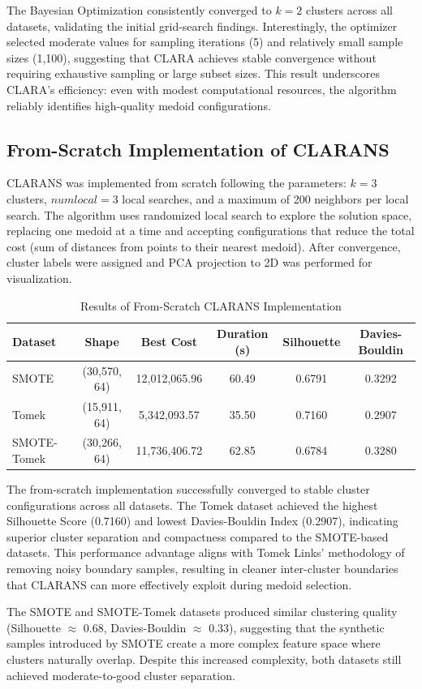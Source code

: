 The Bayesian Optimization consistently converged to $k=2$ clusters across all datasets, validating the initial grid-search findings. Interestingly, the optimizer selected moderate values for sampling iterations (5) and relatively small sample sizes (1,100), suggesting that CLARA achieves stable convergence without requiring exhaustive sampling or large subset sizes. This result underscores CLARA's efficiency: even with modest computational resources, the algorithm reliably identifies high-quality medoid configurations.


\subsection{From-Scratch Implementation of CLARANS}

CLARANS was implemented from scratch following the parameters: $k=3$ clusters, $numlocal=3$ local searches, and a maximum of 200 neighbors per local search. The algorithm uses randomized local search to explore the solution space, replacing one medoid at a time and accepting configurations that reduce the total cost (sum of distances from points to their nearest medoid). After convergence, cluster labels were assigned and PCA projection to 2D was performed for visualization.

\begin{table}[H]
\centering
\caption{Results of From-Scratch CLARANS Implementation}
\label{tab:clarans_scratch_results}
\begin{tabular}{|l|c|c|c|c|c|}
\hline
\textbf{Dataset} & \textbf{Shape} & \textbf{Best Cost} & \textbf{Duration (s)} & \textbf{Silhouette} & \textbf{Davies-Bouldin} \\ \hline
SMOTE & (30,570, 64) & 12,012,065.96 & 60.49 & 0.6791 & 0.3292 \\ \hline
Tomek & (15,911, 64) & 5,342,093.57 & 35.50 & 0.7160 & 0.2907 \\ \hline
SMOTE-Tomek & (30,266, 64) & 11,736,406.72 & 62.85 & 0.6784 & 0.3280 \\ \hline
\end{tabular}
\end{table}

The from-scratch implementation successfully converged to stable cluster configurations across all datasets. The Tomek dataset achieved the highest Silhouette Score (0.7160) and lowest Davies-Bouldin Index (0.2907), indicating superior cluster separation and compactness compared to the SMOTE-based datasets. This performance advantage aligns with Tomek Links' methodology of removing noisy boundary samples, resulting in cleaner inter-cluster boundaries that CLARANS can more effectively exploit during medoid selection.

The SMOTE and SMOTE-Tomek datasets produced similar clustering quality (Silhouette $\approx$ 0.68, Davies-Bouldin $\approx$ 0.33), suggesting that the synthetic samples introduced by SMOTE create a more complex feature space where clusters naturally overlap. Despite this increased complexity, both datasets still achieved moderate-to-good cluster separation. 
